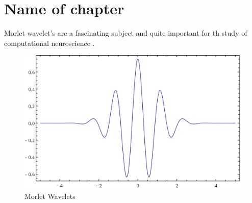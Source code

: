 \chapter{Name of chapter}

\lipsum[1] %

Morlet wavelet's are a fascinating subject and quite important for th study of computational neuroscience \cite{COHEN2019}.



\begin{figure}[h]
    \centering
    \includegraphics[scale=0.2]{figures/morlet_wavelet.png}
    \caption{Morlet Wavelets}
    \label{fig:morlet}
\end{figure}


